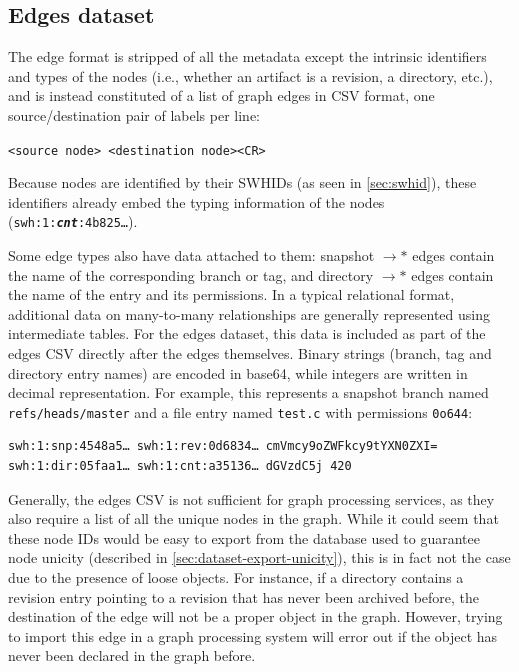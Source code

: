\subsection{Edges dataset}
\label{sec:edges-format}
The edge format is stripped of all the metadata except the intrinsic
identifiers and types of the nodes (i.e., whether an artifact is a revision, a
directory, etc.), and is instead constituted of a list of graph edges in CSV
format, one source/destination pair of labels per line:

\texttt{<source node> <destination node><CR>}

Because nodes are identified by their \glspl{SWHID} (as seen in
\cref{sec:swhid}), these identifiers already embed the typing
information of the nodes (\texttt{swh:1:\emph{\textbf{cnt}}:4b825…}).

Some edge types also have data attached to them: snapshot $\rightarrow\ast$
edges contain the name of the corresponding branch or tag, and
directory $\rightarrow\ast$ edges contain the name of the entry and its
permissions.
In a typical relational format, additional data on many-to-many relationships
are generally represented using intermediate tables. For the edges dataset,
this data is included as part of the edges CSV directly after the edges
themselves. Binary strings (branch, tag and directory entry names) are encoded
in base64, while integers are written in decimal representation. For example,
this represents a snapshot branch named \texttt{refs/heads/master} and a file
entry named \texttt{test.c} with permissions \texttt{0o644}:

\begin{verbatim}
swh:1:snp:4548a5… swh:1:rev:0d6834… cmVmcy9oZWFkcy9tYXN0ZXI=
swh:1:dir:05faa1… swh:1:cnt:a35136… dGVzdC5j 420
\end{verbatim}

Generally, the edges CSV is not sufficient for graph processing services, as
they also require a list of all the unique nodes in the graph. While it could
seem that these node IDs would be easy to export from the database used to
guarantee node unicity (described in \cref{sec:dataset-export-unicity}),
this is in fact not the case due to the presence of loose objects. For
instance, if a directory contains a revision entry pointing to a revision that
has never been archived before, the destination of the edge will not be a
proper object in the graph. However, trying to import this edge in a graph
processing system will error out if the object has never been declared in the
graph before.

